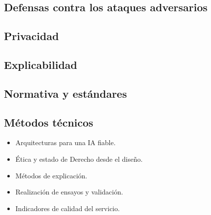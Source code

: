 \subsection{Defensas contra los ataques adversarios}

\subsection{Privacidad}

\subsection{Explicabilidad}

\subsection{Normativa y estándares}


\subsection{Métodos técnicos}
\begin{itemize}
    \item Arquitecturas para una IA fiable.
    \item Ética y estado de Derecho desde el diseño.
    \item Métodos de explicación.
    \item Realización de ensayos y validación.
    \item Indicadores de calidad del servicio.
\end{itemize}

